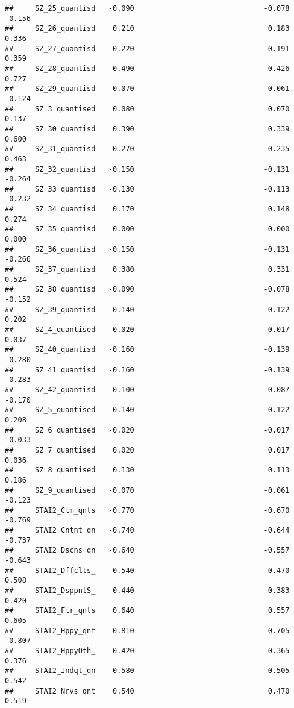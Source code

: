 \documentclass[]{article}
\begin{document}
\begin{verbatim}
##     SZ_25_quantisd   -0.090                              -0.078   -0.156
##     SZ_26_quantisd    0.210                               0.183    0.336
##     SZ_27_quantisd    0.220                               0.191    0.359
##     SZ_28_quantisd    0.490                               0.426    0.727
##     SZ_29_quantisd   -0.070                              -0.061   -0.124
##     SZ_3_quantised    0.080                               0.070    0.137
##     SZ_30_quantisd    0.390                               0.339    0.600
##     SZ_31_quantisd    0.270                               0.235    0.463
##     SZ_32_quantisd   -0.150                              -0.131   -0.264
##     SZ_33_quantisd   -0.130                              -0.113   -0.232
##     SZ_34_quantisd    0.170                               0.148    0.274
##     SZ_35_quantisd    0.000                               0.000    0.000
##     SZ_36_quantisd   -0.150                              -0.131   -0.266
##     SZ_37_quantisd    0.380                               0.331    0.524
##     SZ_38_quantisd   -0.090                              -0.078   -0.152
##     SZ_39_quantisd    0.140                               0.122    0.202
##     SZ_4_quantised    0.020                               0.017    0.037
##     SZ_40_quantisd   -0.160                              -0.139   -0.280
##     SZ_41_quantisd   -0.160                              -0.139   -0.283
##     SZ_42_quantisd   -0.100                              -0.087   -0.170
##     SZ_5_quantised    0.140                               0.122    0.208
##     SZ_6_quantised   -0.020                              -0.017   -0.033
##     SZ_7_quantised    0.020                               0.017    0.036
##     SZ_8_quantised    0.130                               0.113    0.186
##     SZ_9_quantised   -0.070                              -0.061   -0.123
##     STAI2_Clm_qnts   -0.770                              -0.670   -0.769
##     STAI2_Cntnt_qn   -0.740                              -0.644   -0.737
##     STAI2_Dscns_qn   -0.640                              -0.557   -0.643
##     STAI2_Dffclts_    0.540                               0.470    0.508
##     STAI2_DsppntS_    0.440                               0.383    0.420
##     STAI2_Flr_qnts    0.640                               0.557    0.605
##     STAI2_Hppy_qnt   -0.810                              -0.705   -0.807
##     STAI2_HppyOth_    0.420                               0.365    0.376
##     STAI2_Indqt_qn    0.580                               0.505    0.542
##     STAI2_Nrvs_qnt    0.540                               0.470    0.519

\end{verbatim}
\end{document}
